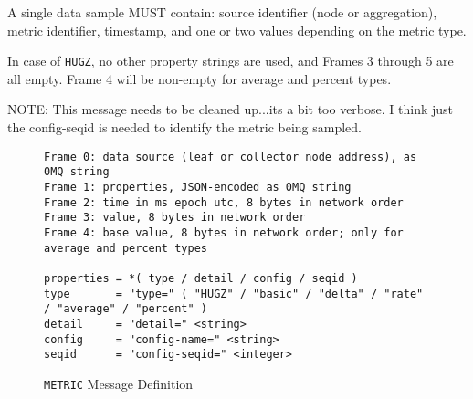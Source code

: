 A single data sample MUST contain: source identifier (node or aggregation), metric identifier, timestamp, and one or two
values depending on the metric type.

In case of \texttt{HUGZ}, no other property strings are used, and Frames 3 through 5 are all empty. Frame 4 will be
non-empty for average and percent types.

NOTE: This message needs to be cleaned up...its a bit too verbose. I think just the config-seqid is needed to identify
      the metric being sampled.

\begin{figure}[H]
\vspace{+10pt}
\begin{verbatim}
Frame 0: data source (leaf or collector node address), as 0MQ string
Frame 1: properties, JSON-encoded as 0MQ string
Frame 2: time in ms epoch utc, 8 bytes in network order
Frame 3: value, 8 bytes in network order
Frame 4: base value, 8 bytes in network order; only for average and percent types

properties = *( type / detail / config / seqid )
type       = "type=" ( "HUGZ" / "basic" / "delta" / "rate" / "average" / "percent" )
detail     = "detail=" <string>
config     = "config-name=" <string>
seqid      = "config-seqid=" <integer>
\end{verbatim}
\vspace{-20pt}
\caption{\texttt{METRIC} Message Definition}
\label{fig:message_metric}
\end{figure}
